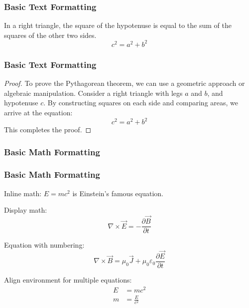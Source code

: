 \documentclass[aspectratio=169,professionalfonts]{beamer}
\begin{document}
\begin{frame}
    \frametitle{Basic Text Formatting}
    
    \begin{theorem}
        In a right triangle, the square of the hypotenuse is equal to the sum of the squares of the other two sides.
        \begin{equation}
            c^2 = a^2 + b^2
        \end{equation}
    \end{theorem}
\end{frame}

\begin{frame}
    \frametitle{Basic Text Formatting}
    
    \begin{proof}
        To prove the Pythagorean theorem, we can use a geometric approach or algebraic manipulation. 
        Consider a right triangle with legs \(a\) and \(b\), and hypotenuse \(c\). By constructing squares on each side and comparing areas, we arrive at the equation:
        \[
        c^2 = a^2 + b^2
        \]
        This completes the proof.
    \end{proof}
\end{frame}

\ugmcenteredlogoslide
\begin{frame}
    \frametitle{Basic Math Formatting}
    
\end{frame}

\ugmnormalslide
\begin{frame}
    \frametitle{Basic Math Formatting}
    
    Inline math: $E = mc^2$ is Einstein's famous equation.
    
    Display math:
    \[
    \nabla \times \vec{E} = -\frac{\partial \vec{B}}{\partial t}
    \]
    
    Equation with numbering:
    \begin{equation}
        \nabla \times \vec{B} = \mu_0 \vec{J} + \mu_0 \varepsilon_0 \frac{\partial \vec{E}}{\partial t}
    \end{equation}
    
    Align environment for multiple equations:
    \begin{align}
        E &= mc^2 \\
        m &= \frac{E}{c^2}
    \end{align}
\end{frame}
\end{document}
